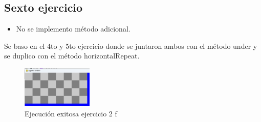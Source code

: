 \documentclass{article}
\begin{document}
	\subsection{Sexto ejercicio}
	\begin{itemize}	
		\item No se implemento método adicional.
	\end{itemize}
	
	Se baso en el 4to y 5to ejercicio donde se juntaron ambos con el método under 
	y se duplico con el método horizontalRepeat.
	\begin{figure}[H]
		\centering
		\includegraphics[width=0.3\textwidth,keepaspectratio]{img/e2f.png}
		\caption{Ejecución exitosa ejercicio 2 f}
	\end{figure}
\end{document}
